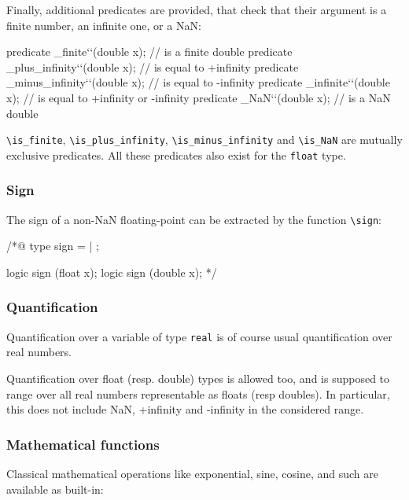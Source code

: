 Finally, additional predicates are provided, that check that their argument
is a finite number, an infinite one, or a NaN:
\begin{listing}{1}
predicate \is_finite``(double x); // is a finite double
predicate \is_plus_infinity``(double x); // is equal to +infinity
predicate \is_minus_infinity``(double x); // is equal to -infinity
predicate \is_infinite``(double x); // is equal to +infinity or -infinity
predicate \is_NaN``(double x); // is a NaN double
\end{listing}
\lstinline|\is_finite|, \lstinline|\is_plus_infinity|,
\lstinline|\is_minus_infinity| and \lstinline|\is_NaN| are mutually
exclusive predicates.
All these predicates also exist for the \lstinline|float| type.

\subsubsection{Sign}

The sign of a non-NaN floating-point  can be extracted by
the function \lstinline|\sign|:
\begin{listing}{1}
/*@
 type sign = \Positive | \Negative;

 logic sign \sign(float x);
 logic sign \sign(double x);
*/
\end{listing}


\subsubsection{Quantification}

Quantification over a variable of type \lstinline|real| is of course usual
quantification over real numbers.

Quantification over float (resp. double) types is allowed too, and is
supposed to range over all real numbers representable as floats (resp
doubles). In particular, this does not include NaN, +infinity and
-infinity in the considered range.


\subsubsection{Mathematical functions}

Classical mathematical operations like exponential, sine, cosine, and
such are available as built-in:

